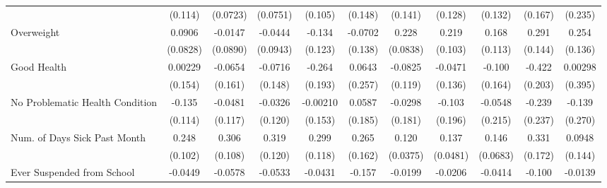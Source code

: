 {\begin{tabular}{l*{10}{c}}
            &     (0.114)         &    (0.0723)         &    (0.0751)         &     (0.105)         &     (0.148)         &     (0.141)         &     (0.128)         &     (0.132)         &     (0.167)         &     (0.235)         \\
\addlinespace
Overweight  &      0.0906         &     -0.0147         &     -0.0444         &      -0.134         &     -0.0702         &       0.228\sym{**} &       0.219\sym{*}  &       0.168         &       0.291\sym{*}  &       0.254         \\
            &    (0.0828)         &    (0.0890)         &    (0.0943)         &     (0.123)         &     (0.138)         &    (0.0838)         &     (0.103)         &     (0.113)         &     (0.144)         &     (0.136)         \\
\addlinespace
Good Health &     0.00229         &     -0.0654         &     -0.0716         &      -0.264         &      0.0643         &     -0.0825         &     -0.0471         &      -0.100         &      -0.422\sym{*}  &     0.00298         \\
            &     (0.154)         &     (0.161)         &     (0.148)         &     (0.193)         &     (0.257)         &     (0.119)         &     (0.136)         &     (0.164)         &     (0.203)         &     (0.395)         \\
\addlinespace
No Problematic Health Condition&      -0.135         &     -0.0481         &     -0.0326         &    -0.00210         &      0.0587         &     -0.0298         &      -0.103         &     -0.0548         &      -0.239         &      -0.139         \\
            &     (0.114)         &     (0.117)         &     (0.120)         &     (0.153)         &     (0.185)         &     (0.181)         &     (0.196)         &     (0.215)         &     (0.237)         &     (0.270)         \\
\addlinespace
Num. of Days Sick Past Month&       0.248\sym{*}  &       0.306\sym{**} &       0.319\sym{**} &       0.299\sym{*}  &       0.265         &       0.120\sym{**} &       0.137\sym{**} &       0.146\sym{*}  &       0.331         &      0.0948         \\
            &     (0.102)         &     (0.108)         &     (0.120)         &     (0.118)         &     (0.162)         &    (0.0375)         &    (0.0481)         &    (0.0683)         &     (0.172)         &     (0.144)         \\
\addlinespace
Ever Suspended from School&     -0.0449         &     -0.0578         &     -0.0533         &     -0.0431         &      -0.157         &     -0.0199         &     -0.0206         &     -0.0414         &      -0.100         &     -0.0139         \\

\end{tabular}}
